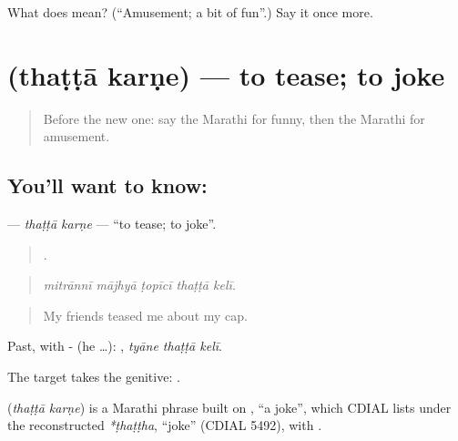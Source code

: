 \begin{tcolorbox}[breakable,colback=teal!4,colframe=teal!35!black,title={Before you move on}]
What does  mean? (\textquotedblleft{}Amusement; a bit of fun\textquotedblright{}.) Say it once more.
\end{tcolorbox}
\section[\texorpdfstring{\mr{थट्टा} \mr{करणे} (thaṭṭā karṇe)}{थट्टा करणे (thaṭṭā karṇe)}]{  (thaṭṭā karṇe) — to tease; to joke}

\label{lesson:MR-C473-thatta-karne}



\begin{quote}
Before the new one: say the Marathi for funny, then the Marathi for amusement.
\end{quote}

\subsection*{You'll want to know:  }
\textbf{ } — \emph{thaṭṭā karṇe} — \textquotedblleft{}to tease; to joke\textquotedblright{}.

\begin{quote}
    .
\end{quote}

\begin{quote}
\emph{mitrānnī mājhyā ṭopīcī thaṭṭā kelī.}
\end{quote}

\begin{quote}
My friends teased me about my cap.
\end{quote}

Past, with - (he …):   , \emph{tyāne thaṭṭā kelī}.

The target takes the genitive:   .

\begin{cousinweb}
\textbf{ } (\emph{thaṭṭā karṇe}) is a Marathi phrase built on , \textquotedblleft{}a joke\textquotedblright{}, which CDIAL lists under the reconstructed \emph{*ṭhaṭṭha}, \textquotedblleft{}joke\textquotedblright{} (CDIAL 5492), with .
\end{cousinweb}

